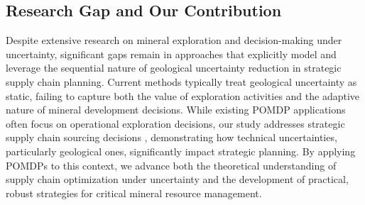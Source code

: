 \subsection{Research Gap and Our Contribution}
Despite extensive research on mineral exploration and decision-making under uncertainty, significant gaps remain in approaches that explicitly model and leverage the sequential nature of geological uncertainty reduction in strategic supply chain planning. Current methods typically treat geological uncertainty as static, failing to capture both the value of exploration activities and the adaptive nature of mineral development decisions. While existing POMDP applications often focus on operational exploration decisions, our study addresses strategic supply chain sourcing decisions \citep{csis2024friendshoring, mcnulty2021barriers}, demonstrating how technical uncertainties, particularly geological ones, significantly impact strategic planning. By applying POMDPs to this context, we advance both the theoretical understanding of supply chain optimization under uncertainty and the development of practical, robust strategies for critical mineral resource management.
